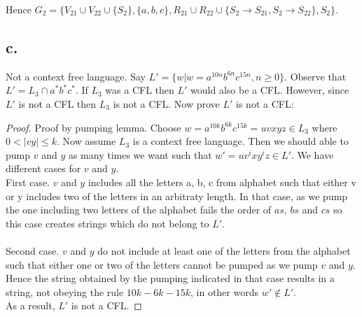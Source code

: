 \documentclass[12pt]{article}
\begin{document}
Hence  $G_{2} = \{V_{21}\cup V_{22}\cup \{S_2\}, \{a,b,c\}, R_{21}\cup R_{22}\cup \{S_2\rightarrow S_{21}, S_2\rightarrow S_{22}\}, S_2\}$.

\subsection*{c.}

Not a context free language. Say $L' = \{w | w=a^{10n}b^{6n}c^{15n}, n\geq 0\}$. Observe that $L' = L_3 \cap a^*b^*c^*$. If $L_3$ was a CFL then $L'$ would also be a CFL. However, since $L'$ is not a CFL then $L_3$ is not a CFL. Now prove $L'$ is not a CFL:

\begin{proof} Proof by pumping lemma.
    Choose $w = a^{10k}b^{6k}c^{15k} = uvxyz\in L_3$ where $0 <|vy| \leq  k$. Now assume $L_3$ is a context free language. Then we should able to pump $v$ and $y$ as many times we want such that $w' = uv^ixy^iz\in L'$. We have different cases for $v$ and $y$.\\

    First case. $v$ and $y$ includes all the letters a, b, c from alphabet such that either v or y includes two of the letters in an arbitraty length. In that case, as we pump the one including two letters of the alphabet fails the order of $as$, $bs$ and $cs$ so this case creates strings which do not belong to $L'$.\\ \\
    Second case. $v$ and $y$ do not include at least one of the letters from the alphabet such that either one or two of the letters cannot be pumped as we pump $v$ and $y$. Hence the string obtained by the pumping indicated in that case results in a string, not obeying the rule $10k-6k-15k$, in other words $w'\notin L'$. \\
    As a result,  $L'$ is not a CFL.
\end{proof}
\end{document}
